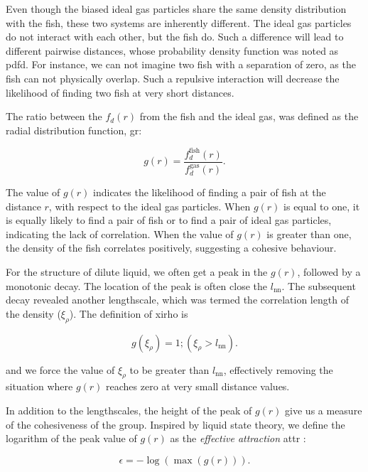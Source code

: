 \documentclass[11pt,twoside]{report}
\begin{document}
Even though the biased ideal gas particles share the same density distribution with the fish, these two systems are inherently different. The ideal gas particles do not interact with each other, but the fish do.
Such a difference will lead to different pairwise distances, whose probability density function was noted as \gls{pdfd}.
For instance, we can not imagine two fish with a separation of zero, as the fish can not physically overlap.
Such a repulsive interaction will decrease the likelihood of finding two fish at very short distances.
 
The ratio between the $f_d(r)$ from the fish and the ideal gas, was defined as the radial distribution function, \gls{gr}:

\begin{equation}
	g(r) = \frac{f_d^\textrm{fish}(r)}{f_d^\textrm{gas}(r)}.
\label{eq:gr}
\end{equation}

\noindent The value of $g(r)$ indicates the likelihood of finding a pair of fish at the distance $r$, with respect to the ideal gas particles. When $g(r)$ is equal to one, it is equally likely to find a pair of fish or to find a pair of ideal gas particles, indicating the lack of correlation. When the value of $g(r)$ is greater than one, the density of the fish correlates positively, suggesting a cohesive behaviour.

For the structure of dilute liquid, we often get a peak in the $g(r)$, followed by a monotonic decay. The location of the peak is often close the $l_\mathrm{nn}$. The subsequent decay revealed another lengthscale, which was termed the correlation length of the density ($\xi_\rho$). The definition of \gls{xirho} is

\begin{equation}
	g(\xi_\rho) = 1; (\xi_\rho > l_\mathrm{nn}).
\label{eq:length-density}
\end{equation}

\noindent and we force the value of $\xi_\rho$ to be greater than $l_\mathrm{nn}$, effectively removing the situation where $g(r)$ reaches zero at very small distance values.

In addition to the lengthscales, the height of the peak of $g(r)$ give us a measure of the cohesiveness of the group. Inspired by liquid state theory, we define the logarithm of the peak value of $g(r)$ as the \emph{effective attraction} \gls{attr} \cite{hansen2013}:

\begin{equation}
\epsilon = -\log\left(
	\max(g(r))
\right).
\label{eq:effective-attraction}
\end{equation}
\end{document}
